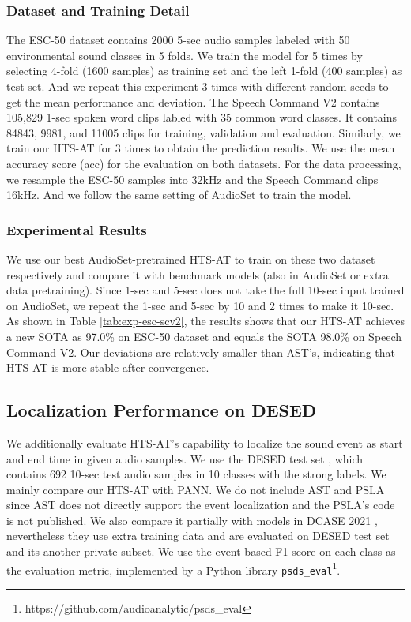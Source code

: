 \documentclass{article}
\begin{document}
\subsubsection{Dataset and Training Detail}
The ESC-50 dataset contains 2000 5-sec audio samples labeled with 50 environmental sound classes in 5 folds. We train the model for 5 times by selecting 4-fold (1600 samples) as training set and the left 1-fold (400 samples) as test set. And we repeat this experiment 3 times with different random seeds to get the mean performance and deviation. The Speech Command V2 contains 105,829 1-sec spoken word clips labled with 35 common word classes. It contains 84843, 9981, and 11005 clips for training, validation and evaluation. Similarly, we train our HTS-AT for 3 times to obtain the prediction results. We use the mean accuracy score (acc) for the evaluation on both datasets. For the data processing, we resample the ESC-50 samples into 32kHz and the Speech Command clips 16kHz. And we follow the same setting of AudioSet to train the model. 


\vspace{-0.4cm}
\subsubsection{Experimental Results}
\vspace{-0.1cm}
We use our best AudioSet-pretrained HTS-AT to train on these two dataset respectively and compare it with benchmark models (also in AudioSet or extra data pretraining). Since 1-sec and 5-sec does not take the full 10-sec input trained on AudioSet, we repeat the 1-sec and 5-sec by 10 and 2 times to make it 10-sec. As shown in Table \ref{tab:exp-esc-scv2}, the results shows that our HTS-AT achieves a new SOTA as 97.0\% on ESC-50 dataset and equals the SOTA 98.0\% on Speech Command V2. Our deviations are relatively smaller than AST's, indicating that HTS-AT is more stable after convergence.

\vspace{-0.3cm}
\subsection{Localization Performance on DESED}
We additionally evaluate HTS-AT's capability to localize the sound event as start and end time in given audio samples. We use the DESED test set \cite{desed}, which contains 692 10-sec test audio samples in 10 classes with the strong labels. We mainly compare our HTS-AT with PANN. We do not include AST and PSLA since AST does not directly support the event localization and the PSLA's code is not published. We also compare it partially with models in DCASE 2021 \cite{dcase2021}, nevertheless they use extra training data and are evaluated on DESED test set and its another private subset. We use the event-based F1-score on each class as the evaluation metric, implemented by a Python library \texttt{psds\_eval}\footnote{https://github.com/audioanalytic/psds\_eval}. 
\end{document}
